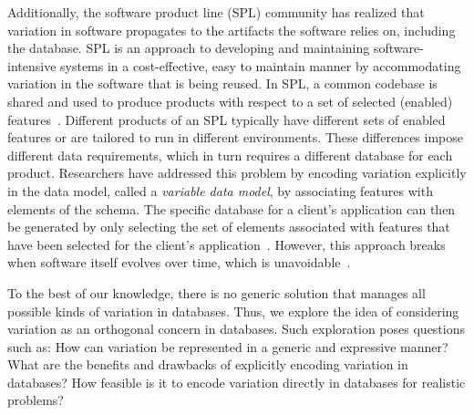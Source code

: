 Additionally, the software product line (SPL) community has realized that 
variation in software propagates to the artifacts the software relies on, 
including the database.
%
SPL is an
approach to developing and maintaining software-intensive systems 
in a cost-effective, easy to maintain manner by accommodating variation
in the software that is being reused. 
%
In SPL, a common codebase is shared and used to produce products with respect to
a set of selected (enabled) features~\cite{splBook}. 
%
Different products of an SPL typically have different
sets of enabled features or are tailored to run in different environments. These
differences impose different data requirements, which in turn requires a different database 
for each product.
%
Researchers have addressed this problem by
encoding variation explicitly in the data model, called a \emph{variable data model},
by associating features with elements of the schema.
The specific database for a client's application can then be generated 
 by only selecting the set of elements 
associated with features that have been selected for the client's application~\cite{skrhas09DBIS, slrs12CAiSE, 
ad11varDataModel}. 
However, this approach breaks when software itself evolves over time, 
which is unavoidable~\cite{dbSPLevolve}.

To the best of our knowledge, 
there is no generic solution that manages all possible kinds of
variation in databases. Thus, we explore the idea of considering
variation as an orthogonal concern in databases. Such exploration
poses questions such as: How can variation be represented in a generic and
expressive manner? 
What are the benefits and drawbacks of explicitly encoding variation in 
databases? How feasible is it to encode variation 
directly in databases for realistic problems?

